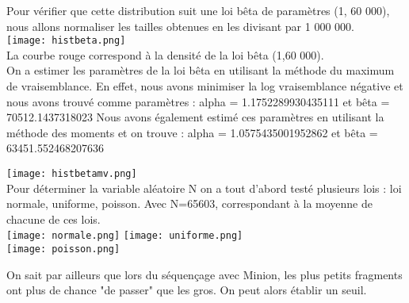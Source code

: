 \documentclass[12pt]{article}
\begin{document}
Pour vérifier que cette distribution suit une loi bêta de paramètres (1, 60 000), nous allons normaliser les tailles obtenues en les divisant par 1 000 000.\\
\texttt{[image: histbeta.png]}\\
La courbe rouge correspond à la densité de la loi bêta (1,60 000).\\
On a estimer les paramètres de la loi bêta en utilisant la méthode du maximum de vraisemblance. En effet, nous avons minimiser la log vraisemblance négative et nous avons trouvé comme paramètres : 
alpha = 1.1752289930435111 et bêta = 70512.1437318023
Nous avons également estimé ces paramètres en utilisant la méthode des moments et on trouve : 
alpha = 1.0575435001952862 et bêta = 63451.552468207636

\texttt{[image: histbetamv.png]}\\
Pour déterminer la variable aléatoire N on a tout d'abord testé plusieurs lois : loi normale, uniforme, poisson. 
Avec N=65603, correspondant à la moyenne de chacune de ces lois.
\\
\texttt{[image: normale.png]}
\texttt{[image: uniforme.png]}\\
\texttt{[image: poisson.png]}

On sait par ailleurs que lors du séquençage avec Minion, les plus petits fragments ont plus de chance "de passer" que les gros.
On peut alors établir un seuil. 
\end{document}

